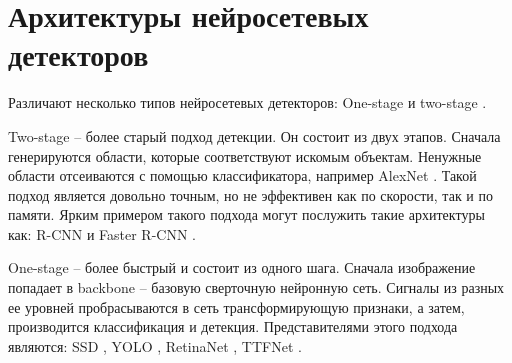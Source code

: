 \section{Архитектуры нейросетевых детекторов}\label{sect-4}

Различают несколько типов нейросетевых детекторов: One-stage и two-stage \cite{lib-detector-types}.

Two-stage -- более старый подход детекции. Он состоит из двух этапов. Сначала генерируются области, которые соответствуют искомым объектам. Ненужные области отсеиваются с помощью классификатора, например AlexNet \cite{lib-alexnet}. Такой подход является довольно точным, но не эффективен как по скорости, так и по памяти. Ярким примером такого подхода могут послужить такие архитектуры как: R-CNN и Faster R-CNN \cite{lib-rcnn}.

One-stage -- более быстрый и состоит из одного шага. Сначала изображение попадает в backbone -- базовую сверточную нейронную сеть. Сигналы из разных ее уровней пробрасываются в сеть трансформирующую признаки, а затем, производится классификация и детекция. Представителями этого подхода являются: SSD \cite{lib-ssd}, YOLO \cite{lib-yolo}, RetinaNet \cite{lib-retinanet}, TTFNet \cite{lib-ttfnet}.



\clearpage